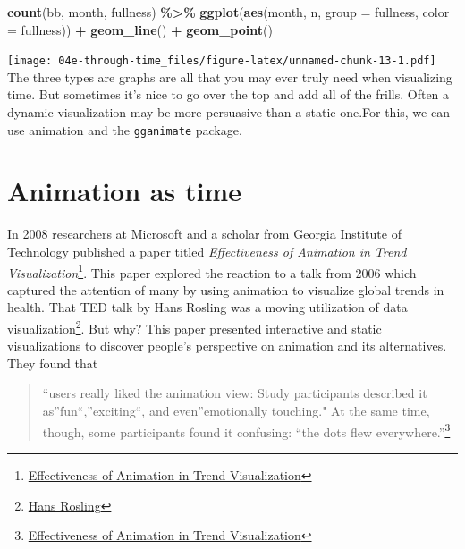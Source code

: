 \documentclass[
]{book}
\newenvironment{Shaded}{\begin{snugshade}}{\end{snugshade}}
\newcommand{\DataTypeTok}[1]{\textcolor[rgb]{0.13,0.29,0.53}{#1}}
\newcommand{\KeywordTok}[1]{\textcolor[rgb]{0.13,0.29,0.53}{\textbf{#1}}}
\newcommand{\NormalTok}[1]{#1}
\newcommand{\OperatorTok}[1]{\textcolor[rgb]{0.81,0.36,0.00}{\textbf{#1}}}
\newcommand{\StringTok}[1]{\textcolor[rgb]{0.31,0.60,0.02}{#1}}
\begin{document}
\begin{Shaded}
\begin{Highlighting}[]
\KeywordTok{count}\NormalTok{(bb, month, fullness) }\OperatorTok{\%\textgreater{}\%}\StringTok{ }
\StringTok{  }\KeywordTok{ggplot}\NormalTok{(}\KeywordTok{aes}\NormalTok{(month, n, }\DataTypeTok{group =}\NormalTok{ fullness, }\DataTypeTok{color =}\NormalTok{ fullness)) }\OperatorTok{+}
\StringTok{  }\KeywordTok{geom\_line}\NormalTok{() }\OperatorTok{+}\StringTok{ }
\StringTok{  }\KeywordTok{geom\_point}\NormalTok{()}
\end{Highlighting}
\end{Shaded}

\texttt{[image: 04e-through-time\_files/figure-latex/unnamed-chunk-13-1.pdf]}
The three types are graphs are all that you may ever truly need when visualizing time. But sometimes it's nice to go over the top and add all of the frills. Often a dynamic visualization may be more persuasive than a static one.For this, we can use animation and the \texttt{gganimate} package.

\hypertarget{animation-as-time}{%
\section{Animation as time}\label{animation-as-time}}

In 2008 researchers at Microsoft and a scholar from Georgia Institute of Technology published a paper titled \emph{Effectiveness of Animation in Trend Visualization}\footnote{\href{https://www.cc.gatech.edu/~stasko/papers/infovis08-anim.pdf}{Effectiveness of Animation in Trend Visualization}}. This paper explored the reaction to a talk from 2006 which captured the attention of many by using animation to visualize global trends in health. That TED talk by Hans Rosling was a moving utilization of data visualization\footnote{\href{https://www.ted.com/talks/hans_rosling_the_best_stats_you_ve_ever_seen/transcript}{Hans Rosling}}. But why? This paper presented interactive and static visualizations to discover people's perspective on animation and its alternatives. They found that

\begin{quote}
``users really liked the animation view: Study participants described it as''fun``,''exciting``, and even''emotionally touching." At the same time, though, some participants found it confusing: ``the dots flew everywhere.''\footnote{\href{https://www.cc.gatech.edu/~stasko/papers/infovis08-anim.pdf}{Effectiveness of Animation in Trend Visualization}}
\end{quote}
\end{document}
